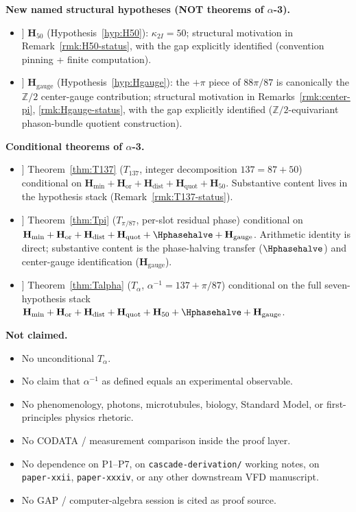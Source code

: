 \documentclass[11pt, a4paper]{amsart}
\theoremstyle{definition}
\newcommand{\Z}{\mathbb{Z}}
\newcommand{\Hmin}{\mathbf{H}_{\min}}
\newcommand{\Hor}{\mathbf{H}_{\mathrm{or}}}
\newcommand{\Hdist}{\mathbf{H}_{\mathrm{dist}}}
\newcommand{\Hquot}{\mathbf{H}_{\mathrm{quot}}}
\newcommand{\Hfifty}{\mathbf{H}_{50}}
\newcommand{\Hgauge}{\mathbf{H}_{\mathrm{gauge}}}
\newcommand{\kappaTwoI}{\kappa_{2I}}
\begin{document}
\textbf{New named structural hypotheses (NOT theorems of
$\alpha$-3).}
\begin{itemize}
\item[[8]] $\Hfifty$ (Hypothesis~\ref{hyp:H50}):
  $\kappaTwoI = 50$; structural motivation in
  Remark~\ref{rmk:H50-status}, with the gap explicitly
  identified (convention pinning + finite computation).
\item[[9]] $\Hgauge$ (Hypothesis~\ref{hyp:Hgauge}): the
  $+\pi$ piece of $88\pi/87$ is canonically the $\Z/2$
  center-gauge contribution; structural motivation in
  Remarks~\ref{rmk:center-pi}, \ref{rmk:Hgauge-status},
  with the gap explicitly identified
  ($\Z/2$-equivariant phason-bundle quotient construction).
\end{itemize}

\textbf{Conditional theorems of $\alpha$-3.}
\begin{itemize}
\item[[10]] Theorem~\ref{thm:T137} ($T_{137}$, integer
  decomposition $137 = 87 + 50$) conditional on
  $\Hmin + \Hor + \Hdist + \Hquot + \Hfifty$. Substantive
  content lives in the hypothesis stack
  (Remark~\ref{rmk:T137-status}).
\item[[11]] Theorem~\ref{thm:Tpi} ($T_{\pi/87}$, per-slot
  residual phase) conditional on $\Hmin + \Hor + \Hdist +
  \Hquot + \Hphasehalve + \Hgauge$. Arithmetic identity is
  direct; substantive content is the phase-halving transfer
  ($\Hphasehalve$) and center-gauge identification
  ($\Hgauge$).
\item[[12]] Theorem~\ref{thm:Talpha} ($T_\alpha$,
  $\alpha^{-1} = 137 + \pi/87$) conditional on the full
  seven-hypothesis stack
  $\Hmin + \Hor + \Hdist + \Hquot + \Hfifty + \Hphasehalve + \Hgauge$.
\end{itemize}

\textbf{Not claimed.}
\begin{itemize}
\item No unconditional $T_\alpha$.
\item No claim that $\alpha^{-1}$ as defined equals an
  experimental observable.
\item No phenomenology, photons, microtubules, biology,
  Standard Model, or first-principles physics rhetoric.
\item No CODATA / measurement comparison inside the proof
  layer.
\item No dependence on P1--P7, on \texttt{cascade-derivation/}
  working notes, on \texttt{paper-xxii},
  \texttt{paper-xxxiv}, or any other downstream VFD
  manuscript.
\item No GAP / computer-algebra session is cited as proof
  source.
\end{itemize}
\end{document}
